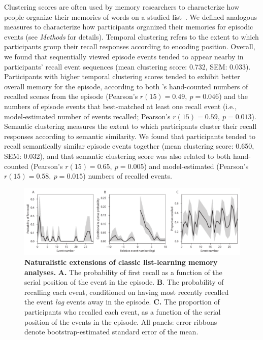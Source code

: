 \documentclass[10pt]{article}
\begin{document}
Clustering scores are often used by memory researchers to characterize how people organize their memories of words on a studied list~\citep[for review, see][]{PolyEtal09}.  We defined analogous measures to characterize how participants organized their memories for episodic events (see \textit{Methods} for details).  Temporal clustering refers to the extent to which participants group their recall responses according to encoding position.  Overall, we found that sequentially viewed episode events tended to appear nearby in participants' recall event sequences (mean clustering score: 0.732, SEM: 0.033).  Participants with higher temporal clustering scores tended to exhibit better overall memory for the episode, according to both \cite{ChenEtal17}'s hand-counted numbers of recalled scenes from the episode (Pearson's $r(15) = 0.49,~p = 0.046$) and the numbers of episode events that best-matched at least one recall event (i.e., model-estimated number of events recalled; Pearson's $r(15) = 0.59,~p = 0.013$).  Semantic clustering measures the extent to which participants cluster their recall responses according to semantic similarity.  We found that participants tended to recall semantically similar episode events together (mean clustering score: 0.650, SEM: 0.032), and that semantic clustering score was also related to both hand-counted  (Pearson's $r(15) = 0.65,~p = 0.005$) and model-estimated (Pearson's $r(15) = 0.58,~p = 0.015$) numbers of recalled events.

\begin{figure}[tp]
  \centering
  \includegraphics[width=1\textwidth]{figs/list_learning}
  \caption{\small \textbf{Naturalistic extensions of classic list-learning memory analyses.} \textbf{A.} The probability of first recall as a function of the serial position of the event in the episode. \textbf{B}.  The probability of recalling each event, conditioned on having most recently recalled the event \textit{lag} events away in the episode.  \textbf{C.} The proportion of participants who recalled each event, as a function of the serial position of the events in the episode.  All panels: error ribbons denote bootstrap-estimated standard error of the mean.}
  \label{fig:list-learning}
\end{figure}
\end{document}

